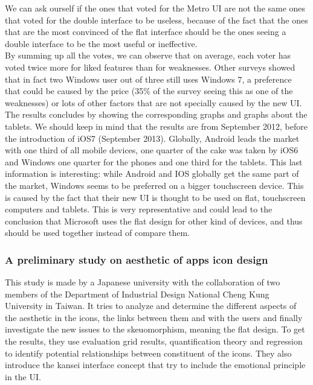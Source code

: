 \documentclass[a4paper,11pt] {article}
\theoremstyle{definition}
\begin{document}
    We can ask ourself if the ones that voted for the Metro UI are not the same ones that voted for the double interface to be useless, because of the fact that the ones that are the most convinced of the flat interface should be the ones seeing a double interface to be the most useful or ineffective.\\

    By summing up all the votes, we can observe that on average, each voter has voted twice more for liked features than for weaknesses. Other surveys showed that in fact two Windows user out of three still uses Windows 7, a preference that could be caused by the price (35\% of the survey seeing this as one of the weaknesses) or lots of other factors that are not specially caused by the new UI.\\

    The results concludes by showing the corresponding graphs and graphs about the tablets. We should keep in mind that the results are from September 2012, before the introduction of iOS7 (September 2013). Globally, Android leads the market with one third of all mobile devices, one quarter of the cake was taken by iOS6 and Windows one quarter for the phones and one third for the tablets. This last information is interesting: while Android and IOS globally get the same part of the market, Windows seems to be preferred on a bigger touchscreen device. This is caused by the fact that their new UI is thought to be used on flat, touchscreen computers and tablets. This is very representative and could lead to the conclusion that Microsoft uses the flat design for other kind of devices, and thus should be used together instead of compare them.

    \subsubsection{A preliminary study on aesthetic of apps icon design}

    This study \cite{jpAnalitics} is made by a Japanese university with the collaboration of two members of the Department of Industrial Design National Cheng Kung University in Taiwan. It tries to analyze and determine the different aspects of the aesthetic in the icons, the links between them and with the users and finally investigate the new issues to the skeuomorphism, meaning the flat design. To get the results, they use evaluation grid results, quantification theory and regression to identify potential relationships between constituent of the icons. They also introduce the kansei interface concept that try to include the emotional principle in the UI.\\
\end{document}

